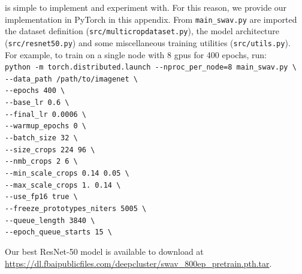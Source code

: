 \OURS is simple to implement and experiment with.
For this reason, we provide our \OURS implementation in PyTorch in this appendix.
From \texttt{main\_swav.py} are imported the dataset definition (\texttt{src/multicropdataset.py}), the model architecture (\texttt{src/resnet50.py}) and some miscellaneous training utilities (\texttt{src/utils.py}).
\\

For example, to train \OURS on a single node with 8 gpus for 400 epochs, run:
\\
\texttt{python -m torch.distributed.launch -{}-nproc\_per\_node=8 main\_swav.py \textbackslash \\}
\texttt{-{}-data\_path /path/to/imagenet \textbackslash \\}
\texttt{-{}-epochs 400 \textbackslash \\}
\texttt{-{}-base\_lr 0.6 \textbackslash \\}
\texttt{-{}-final\_lr 0.0006 \textbackslash \\}
\texttt{-{}-warmup\_epochs 0 \textbackslash \\}
\texttt{-{}-batch\_size 32 \textbackslash \\}
\texttt{-{}-size\_crops 224 96 \textbackslash \\}
\texttt{-{}-nmb\_crops 2 6 \textbackslash \\}
\texttt{-{}-min\_scale\_crops 0.14 0.05 \textbackslash \\}
\texttt{-{}-max\_scale\_crops 1. 0.14 \textbackslash \\}
\texttt{-{}-use\_fp16 true \textbackslash \\}
\texttt{-{}-freeze\_prototypes\_niters 5005 \textbackslash \\}
\texttt{-{}-queue\_length 3840 \textbackslash \\}
\texttt{-{}-epoch\_queue\_starts 15 \textbackslash \\}

Our best ResNet-50 \OURS model is available to download at \url{https://dl.fbaipublicfiles.com/deepcluster/swav_800ep_pretrain.pth.tar}.




